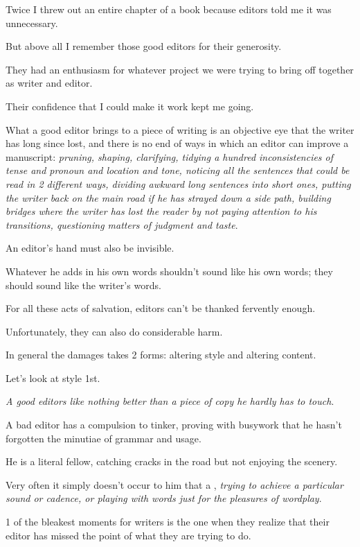 \documentclass{book}
\numberwithin{equation}{section}
\begin{document}
Twice I threw out an entire chapter of a book because editors told me it was unnecessary.

But above all I remember those good editors for their generosity.

They had an enthusiasm for whatever project we were trying to bring off together as writer and editor.

Their confidence that I could make it work kept me going.

What a good editor brings to a piece of writing is an objective eye that the writer has long since lost, and there is no end of ways in which an editor can improve a manuscript: \textit{pruning, shaping, clarifying, tidying a hundred inconsistencies of tense and pronoun and location and tone, noticing all the sentences that could be read in 2 different ways, dividing awkward long sentences into short ones, putting the writer back on the main road if he has strayed down a side path, building bridges where the writer has lost the reader by not paying attention to his transitions, questioning matters of judgment and taste}.
    
An editor's hand must also be invisible.

Whatever he adds in his own words shouldn't sound like his own words; they should sound like the writer's words.

%
For all these acts of salvation, editors can't be thanked fervently enough.

Unfortunately, they can also do considerable harm.

In general the damages takes 2 forms: altering style and altering content.

Let's look at style 1st.

%
\textit{A good editors like nothing better than a piece of copy he hardly has to touch}.

A bad editor has a compulsion to tinker, proving with busywork that he hasn't forgotten the minutiae of grammar and usage.

He is a literal fellow, catching cracks in the road but not enjoying the scenery.

Very often it simply doesn't occur to him that a , \textit{trying to achieve a particular sound or cadence, or playing with words just for the pleasures of wordplay}.

1 of the bleakest moments for writers is the one when they realize that their editor has missed the point of what they are trying to do.
\end{document}
